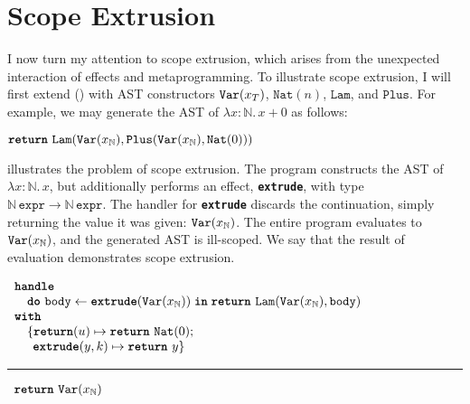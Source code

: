 \section{Scope Extrusion}\label{section:scope-extrusion-technical}
I now turn my attention to scope extrusion, which arises from the unexpected interaction of effects and metaprogramming. To illustrate scope extrusion, I will first extend \efflang{} () with AST constructors $\texttt{Var}(x_{T})$, $\texttt{Nat}(n)$, $\texttt{Lam}$, and $\texttt{Plus}$. For example, we may generate the AST of $\lambda x: \mathbb{N}. \, x + 0$ as follows:

\begin{eff}
$\texttt{\textbf{return}} \,\, {\texttt{Lam}(\texttt{Var}(x_{\mathbb{N}}), \texttt{Plus}(\texttt{Var}(x_{\mathbb{N}}), \texttt{Nat}(0)))}$
\end{eff}

 illustrates the problem of scope extrusion. The program constructs the AST of $\lambda x: \mathbb{N}. \, x$, but additionally performs an effect, \textbf{\texttt{extrude}}, with type $\mathbb{N} \,  \texttt{expr} \to \mathbb{N} \, \texttt{expr}$. The handler for \textbf{\texttt{extrude}} discards the continuation, simply returning the value it was given: $\texttt{Var}(x_{\mathbb{N}})$. The entire program evaluates to $\texttt{Var}(x_{\mathbb{N}})$, and the generated AST is ill-scoped. We say that the result of evaluation demonstrates scope extrusion.

\begin{code}
  \begin{efflst}
    $\begin{array}{l}
      \textbf{\texttt{handle}} \\
      \quad \texttt{\textbf{do}} \,\, {\texttt{body}} \leftarrow {\textbf{\texttt{extrude}}({\texttt{Var}(x_{\mathbb{N}})})} \; \textbf{\texttt{in}} \; {\texttt{\textbf{return}} \,\, {\texttt{Lam}(\texttt{Var}(x_{\mathbb{N}}), \texttt{body})}} \\
      \textbf{\texttt{with}} \\
      \quad \{ \textbf{\texttt{return}}(u) \mapsto {\texttt{\textbf{return}} \,\, {\texttt{Nat}(0)}}; \\
      \quad \; \, \textbf{\texttt{extrude}}(y, k) \mapsto {\texttt{\textbf{return}} \,\, {y}}\}\\
    \end{array}$
  
    \vspace{2mm} 
  \textcolor{effComment}{\hrule height 0.2mm \relax}
  \vspace{2mm} 
  
  \textcolor{effComment}{$\begin{array}{l}\texttt{\textbf{return}} \,\, {\texttt{Var}(x_{\mathbb{N}})}\end{array}$}
  
  \end{efflst}
  \label{listing:efflang-scope-extrusion}
  \end{code}

